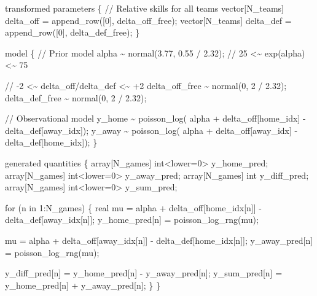 \documentclass[
  letterpaper,
  DIV=11,
  numbers=noendperiod]{scrartcl}
\newenvironment{Shaded}{\begin{snugshade}}{\end{snugshade}}
\newcommand{\CommentTok}[1]{\textcolor[rgb]{0.37,0.37,0.37}{#1}}
\newcommand{\ControlFlowTok}[1]{\textcolor[rgb]{0.00,0.23,0.31}{#1}}
\newcommand{\DataTypeTok}[1]{\textcolor[rgb]{0.68,0.00,0.00}{#1}}
\newcommand{\DecValTok}[1]{\textcolor[rgb]{0.68,0.00,0.00}{#1}}
\newcommand{\FloatTok}[1]{\textcolor[rgb]{0.68,0.00,0.00}{#1}}
\newcommand{\KeywordTok}[1]{\textcolor[rgb]{0.00,0.23,0.31}{#1}}
\newcommand{\NormalTok}[1]{\textcolor[rgb]{0.00,0.23,0.31}{#1}}
\begin{document}
\begin{codelisting}
\begin{Shaded}
\begin{Highlighting}[]
\KeywordTok{transformed parameters}\NormalTok{ \{}
  \CommentTok{// Relative skills for all teams}
  \DataTypeTok{vector}\NormalTok{[N\_teams] delta\_off = append\_row([}\DecValTok{0}\NormalTok{]\textquotesingle{}, delta\_off\_free);}
  \DataTypeTok{vector}\NormalTok{[N\_teams] delta\_def = append\_row([}\DecValTok{0}\NormalTok{]\textquotesingle{}, delta\_def\_free);}
\NormalTok{\}}

\KeywordTok{model}\NormalTok{ \{}
  \CommentTok{// Prior model}
\NormalTok{  alpha \textasciitilde{} normal(}\FloatTok{3.77}\NormalTok{, }\FloatTok{0.55}\NormalTok{ / }\FloatTok{2.32}\NormalTok{); }\CommentTok{// 25 \textless{}\textasciitilde{}  exp(alpha) \textless{}\textasciitilde{} 75}

  \CommentTok{// {-}2 \textless{}\textasciitilde{} delta\_off/delta\_def \textless{}\textasciitilde{} +2}
\NormalTok{  delta\_off\_free \textasciitilde{} normal(}\DecValTok{0}\NormalTok{, }\DecValTok{2}\NormalTok{ / }\FloatTok{2.32}\NormalTok{);}
\NormalTok{  delta\_def\_free \textasciitilde{} normal(}\DecValTok{0}\NormalTok{, }\DecValTok{2}\NormalTok{ / }\FloatTok{2.32}\NormalTok{);}

  \CommentTok{// Observational model}
\NormalTok{  y\_home \textasciitilde{} poisson\_log(  alpha}
\NormalTok{                       + delta\_off[home\_idx] {-} delta\_def[away\_idx]);}
\NormalTok{  y\_away \textasciitilde{} poisson\_log(  alpha}
\NormalTok{                       + delta\_off[away\_idx] {-} delta\_def[home\_idx]);}
\NormalTok{\}}

\KeywordTok{generated quantities}\NormalTok{ \{}
  \DataTypeTok{array}\NormalTok{[N\_games] }\DataTypeTok{int}\NormalTok{\textless{}}\KeywordTok{lower}\NormalTok{=}\DecValTok{0}\NormalTok{\textgreater{} y\_home\_pred;}
  \DataTypeTok{array}\NormalTok{[N\_games] }\DataTypeTok{int}\NormalTok{\textless{}}\KeywordTok{lower}\NormalTok{=}\DecValTok{0}\NormalTok{\textgreater{} y\_away\_pred;}
  \DataTypeTok{array}\NormalTok{[N\_games] }\DataTypeTok{int}\NormalTok{ y\_diff\_pred;}
  \DataTypeTok{array}\NormalTok{[N\_games] }\DataTypeTok{int}\NormalTok{\textless{}}\KeywordTok{lower}\NormalTok{=}\DecValTok{0}\NormalTok{\textgreater{} y\_sum\_pred;}

  \ControlFlowTok{for}\NormalTok{ (n }\ControlFlowTok{in} \DecValTok{1}\NormalTok{:N\_games) \{}
    \DataTypeTok{real}\NormalTok{ mu =  alpha}
\NormalTok{             + delta\_off[home\_idx[n]]}
\NormalTok{             {-} delta\_def[away\_idx[n]];}
\NormalTok{    y\_home\_pred[n] = poisson\_log\_rng(mu);}

\NormalTok{    mu =  alpha}
\NormalTok{        + delta\_off[away\_idx[n]]}
\NormalTok{        {-} delta\_def[home\_idx[n]];}
\NormalTok{    y\_away\_pred[n] = poisson\_log\_rng(mu);}

\NormalTok{    y\_diff\_pred[n] = y\_home\_pred[n] {-} y\_away\_pred[n];}
\NormalTok{    y\_sum\_pred[n] = y\_home\_pred[n] + y\_away\_pred[n];}
\NormalTok{  \}}
\NormalTok{\}}
\end{Highlighting}
\end{Shaded}

\end{codelisting}
\end{document}
